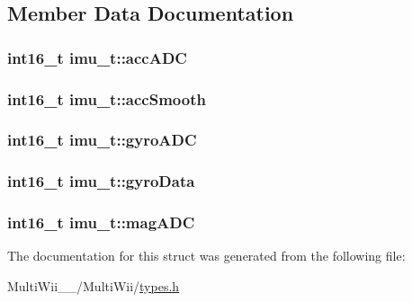 \subsection{Member Data Documentation}
\hypertarget{structimu__t_acaa9d196f82fbbc2670209d19f0c19c4}{
\subsubsection[{acc\-A\-D\-C}]{\setlength{\rightskip}{0pt plus 5cm}int16\-\_\-t imu\-\_\-t\-::acc\-A\-D\-C}}\label{structimu__t_acaa9d196f82fbbc2670209d19f0c19c4}
\hypertarget{structimu__t_ac926eb70490448bbff42b96b836494cc}{
\subsubsection[{acc\-Smooth}]{\setlength{\rightskip}{0pt plus 5cm}int16\-\_\-t imu\-\_\-t\-::acc\-Smooth}}\label{structimu__t_ac926eb70490448bbff42b96b836494cc}
\hypertarget{structimu__t_af05a81dcab2ed384ac6890591db08f0c}{
\subsubsection[{gyro\-A\-D\-C}]{\setlength{\rightskip}{0pt plus 5cm}int16\-\_\-t imu\-\_\-t\-::gyro\-A\-D\-C}}\label{structimu__t_af05a81dcab2ed384ac6890591db08f0c}
\hypertarget{structimu__t_adf0174759aab3cd8fa9e83ea2abc56ad}{
\subsubsection[{gyro\-Data}]{\setlength{\rightskip}{0pt plus 5cm}int16\-\_\-t imu\-\_\-t\-::gyro\-Data}}\label{structimu__t_adf0174759aab3cd8fa9e83ea2abc56ad}
\hypertarget{structimu__t_a5508ca86335bde92d3c2ee9168c7c059}{
\subsubsection[{mag\-A\-D\-C}]{\setlength{\rightskip}{0pt plus 5cm}int16\-\_\-t imu\-\_\-t\-::mag\-A\-D\-C}}\label{structimu__t_a5508ca86335bde92d3c2ee9168c7c059}


The documentation for this struct was generated from the following file\-:\begin{DoxyCompactItemize}
\item 
Multi\-Wii\-\_\-\_/\-Multi\-Wii/\hyperlink{MultiWii__2__4_2MultiWii_2types_8h}{types.\-h}\end{DoxyCompactItemize}
